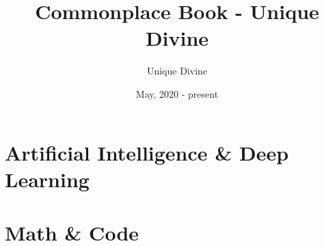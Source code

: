 \documentclass[11pt, fancy, bibstyle=apalike, cite=authoryear]{elegantbook}
\title{Commonplace Book - Unique Divine}
\author{Unique Divine}
\institute{Columbia University}
\date{May, 2020 - present}
\begin{document}
\maketitle
\frontmatter
\tableofcontents



\mainmatter

\part{Artificial Intelligence \& Deep Learning}


\part{Math \& Code}








\end{document}
